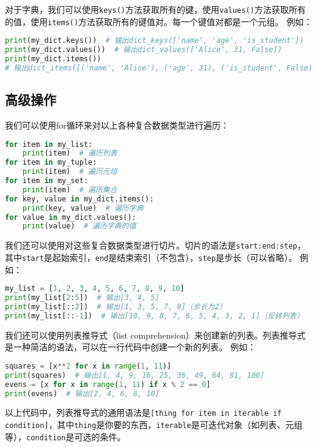 \documentclass[../main.tex]{subfiles}
\begin{document}
对于字典，我们可以使用\texttt{keys()}方法获取所有的键，使用\texttt{values()}方法获取所有的值，使用\texttt{items()}方法获取所有的键值对。每一个键值对都是一个元组。
例如：

\begin{lstlisting}[language=python]
print(my_dict.keys())  # 输出dict_keys(['name', 'age', 'is_student'])
print(my_dict.values())  # 输出dict_values(['Alice', 31, False])
print(my_dict.items())
# 输出dict_items([('name', 'Alice'), ('age', 31), ('is_student', False)])
\end{lstlisting}

\subsection{高级操作}

我们可以使用for循环来对以上各种复合数据类型进行遍历：
\begin{lstlisting}[language=python]
for item in my_list:
    print(item)  # 遍历列表
for item in my_tuple:
    print(item)  # 遍历元组
for item in my_set:
    print(item)  # 遍历集合
for key, value in my_dict.items():
    print(key, value)  # 遍历字典
for value in my_dict.values():
    print(value)  # 遍历字典的值
\end{lstlisting}

我们还可以使用对这些复合数据类型进行切片。切片的语法是\texttt{start:end:step}，其中\texttt{start}是起始索引，\texttt{end}是结束索引（不包含），\texttt{step}是步长（可以省略）。
例如：
\begin{lstlisting}[language=python]
my_list = [1, 2, 3, 4, 5, 6, 7, 8, 9, 10]
print(my_list[2:5])  # 输出[3, 4, 5]
print(my_list[::2])  # 输出[1, 3, 5, 7, 9]（步长为2）
print(my_list[::-1])  # 输出[10, 9, 8, 7, 6, 5, 4, 3, 2, 1]（反转列表）
\end{lstlisting}

我们还可以使用列表推导式（list comprehension）来创建新的列表。列表推导式是一种简洁的语法，可以在一行代码中创建一个新的列表。
例如：
\begin{lstlisting}[language=python]
squares = [x**2 for x in range(1, 11)]
print(squares)  # 输出[1, 4, 9, 16, 25, 36, 49, 64, 81, 100]
evens = [x for x in range(1, 11) if x % 2 == 0]
print(evens)  # 输出[2, 4, 6, 8, 10]
\end{lstlisting}

以上代码中，列表推导式的通用语法是\texttt{[thing for item in iterable if
condition]}，其中\texttt{thing}是你要的东西，\texttt{iterable}是可迭代对象（如列表、元组等），\texttt{condition}是可选的条件。
\end{document}
